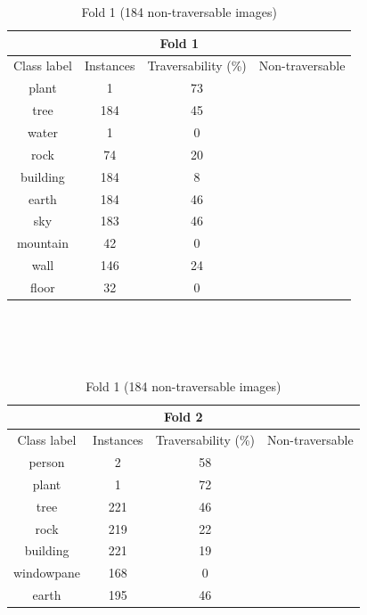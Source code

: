 \documentclass[12pt,a4paper,table,dvipsnames,tikz]{report}
\begin{document}
	\begin{table}[h!]
		\begin{subtable}[h!]{\textwidth}
			\centering
			\begin{tabular}{|c|c|c|c|}
				\hline
				\multicolumn{4}{|c|}{Fold 1}\\
				\hline
				Class label & Instances & Traversability (\%) & Non-traversable\\
				\hline\hline
				plant & 1 & 73 &\\
				\hline
				\rowcolor{tree}
				tree & 184 & 45 & \checkmark\\
				\hline
				water & 1 & 0 & \checkmark\\
				\hline
				rock & 74 & 20 & \checkmark\\
				\hline
				building & 184 & 8 & \checkmark\\
				\hline
				\rowcolor{earth}
				earth & 184 & 46 & \checkmark\\
				\hline
				\rowcolor{sky}
				sky & 183 & 46 & \checkmark\\
				\hline
				mountain & 42 & 0 & \checkmark\\
				\hline
				wall & 146 & 24 & \checkmark\\
				\hline
				floor & 32 & 0 & \checkmark\\
				\hline
			\end{tabular}
			\caption{Fold 1 (184 non-traversable images)}
			\label{table:obst.f1}
		\end{subtable}
		\\\\\\
		\begin{subtable}[h!]{\textwidth}
			\centering
			\begin{tabular}{|c|c|c|c|}
				\hline
				\multicolumn{4}{|c|}{Fold 2}\\
				\hline
				Class label & Instances & Traversability (\%) & Non-traversable\\
				\hline\hline
				person & 2 & 58 &\\
				\hline
				plant & 1 & 72 &\\
				\hline
				\rowcolor{tree}
				tree & 221 & 46 & \checkmark\\
				\hline
				rock & 219 & 22 & \checkmark\\
				\hline
				building & 221 & 19 & \checkmark\\
				\hline
				windowpane & 168 & 0 & \checkmark\\
				\hline
				\rowcolor{earth}
				earth & 195 & 46 & \checkmark\\

\end{tabular}
\end{subtable}
\end{table}
\end{document}
